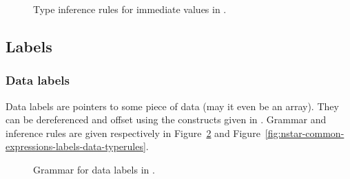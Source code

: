 \begin{figure}[H]
	\centering


	\caption{Type inference rules for immediate values in \nstar.}
	\label{fig:nstar-common-expressions-immediate-typerules}
\end{figure}

\subsection{Labels}\label{subsec:nstar-common-expressions-labels}

\subsubsection{Data labels}\label{subsubsec:nstar-common-expressions-labels-data}

Data labels are pointers to some piece of data (may it even be an array).
They can be dereferenced and offset using the constructs given in \nstar.
Grammar and inference rules are given respectively in Figure~\ref{fig:nstar-common-expressions-labels-data-grammar} and Figure~\ref{fig:nstar-common-expressions-labels-data-typerules}.

\begin{figure}[H]
	\centering

	\caption{Grammar for data labels in \nstar.}
	\label{fig:nstar-common-expressions-labels-data-grammar}
\end{figure}

